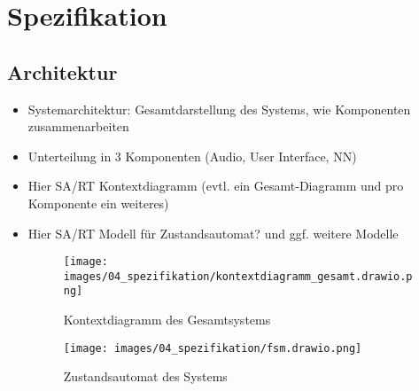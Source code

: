 \newpage
\section{Spezifikation}
\subsection{Architektur}
\begin{itemize}
    \item Systemarchitektur: Gesamtdarstellung des Systems, wie Komponenten zusammenarbeiten
    \item Unterteilung in 3 Komponenten (Audio, User Interface, NN)
    \item Hier SA/RT Kontextdiagramm (evtl. ein Gesamt-Diagramm und pro Komponente ein weiteres)
    \item Hier SA/RT Modell für Zustandsautomat? und ggf. weitere Modelle
    
    \begin{figure}[H]
    	\centering
    	\texttt{[image: images/04\_spezifikation/kontextdiagramm\_gesamt.drawio.png]}
    	\caption{Kontextdiagramm des Gesamtsystems}
    	\label{fig:context_diagram_gesamt}
    \end{figure}
    
    
   
    
    \begin{figure}[H]
    	\centering
    	\texttt{[image: images/04\_spezifikation/fsm.drawio.png]}
    	\caption{Zustandsautomat des Systems}
    	\label{fig:fsm}
    \end{figure}
    

\end{itemize}